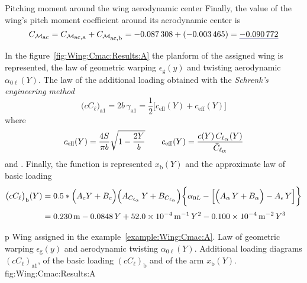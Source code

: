 \documentclass[[12pt,twoside]{book}
\begin{document}
\begin{myExampleX}{Pitching moment around the wing aerodynamic center}{}
Finally, the value of the wing's pitch moment coefficient around its aerodynamic center
is
\[
C_{\mathcal{M}_\mathlarger{\mathrm{ac}}} 
  = C_{\mathcal{M}_\mathlarger{\mathrm{ac,a}}} + C_{\mathcal{M}_\mathlarger{\mathrm{ac,b}}}
  = \SI[round-precision=4]{\myCmZeroAWing}{} 
    +
    ( \SI[round-precision=5]{\myCmZeroBWing}{} )
  = \mathunderline{mydarkblue}{ \SI[round-precision=4]{\myCmZeroWing}{} }
\]

In the figure~\ref{fig:Wing:Cmac:Results:A} the planform of the assigned wing is represented,
the law of geometric warping $\epsilon_\mathrm{g}(y)$ and twisting
aerodynamic $\alpha_{0\ell}(Y)$.
The law of the additional loading obtained with the \emph{Schrenk's engineering method}
\[
\big( cC_\ell \big)_\mathrm{a1} = 2b \, \gamma_\mathrm{a1}
  = \frac{1}{2} \Big[ c_\mathrm{ell}(Y) + c_\mathrm{eff}(Y) \Big]
\]
where
\[
c_\mathrm{ell}(Y) = \frac{4S}{\pi b} \sqrt{1 - \frac{2Y}{b}}
\qquad
c_\mathrm{eff}(Y) = \frac{ c(Y) \, C_{\ell_\mathlarger{\alpha}}(Y) }{ \bar{C}_{\ell_\mathlarger{\alpha}} }
\]
%
and
.
%
Finally, the function is represented $x_\mathrm{b}(Y)$ and the approximate law of basic loading
\[
\begin{split}
\big( cC_\ell \big)_\mathrm{b} (Y)
  & {}=
    0.5*\Big( A_c Y + B_c \Big)
      \Big( A_{C_{\ell_\alpha}} \, Y + B_{C_{\ell_\alpha}} \Big)
    \bigg\{ \alpha_{0L} 
      - \Big[ \Big( A_{\alpha} \, Y + B_{\alpha} \Big) - A_{\epsilon} \, Y \Big]
    \bigg\}
\\[3pt]
  & {}=
      \SI[round-mode=figures,round-precision=3,
        ]{\myCoeffIWing}{\metre}
      \SI[round-mode=figures,round-precision=3,
        ]{\myCoeffJWing}{}\, Y
      +
      \SI[round-mode=figures,round-precision=3,
        fixed-exponent=-4,
        scientific-notation=fixed %
        ]{\myCoeffKWing}{\metre^{-1}}\, Y^2
      \SI[round-mode=figures,round-precision=3,
        fixed-exponent=-4,
        scientific-notation=fixed
        ]{\myCoeffLWing}{\metre^{-2}}\, Y^3
\end{split}
\]

\end{myExampleX}

\EnlargedFigureX%
  {p}%
  {%
    \vspace{0.3cm}
  }%
  {
    Wing assigned in the example~\ref{example:Wing:Cmac:A}.
    Law of geometric warping $\epsilon_\mathrm{g}(y)$ and aerodynamic twisting
       $\alpha_{0\ell}(Y)$.
    Additional loading diagrams $(cC_\ell)_\mathrm{a1}$, 
    of the basic loading $(cC_\ell)_\mathrm{b}$ and  of the arm $x_\mathrm{b}(Y)$.%
  }%
  {fig:Wing:Cmac:Results:A}%
    
\end{document}
